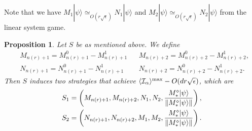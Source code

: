 \documentclass[11pt,letterpaper]{article}
\newcommand{\ket}[1]{|#1\rangle}
\DeclarePairedDelimiter{\norm}{\lVert}{\rVert}
\DeclarePairedDelimiter{\ip}{\langle}{\rangle}
\DeclareMathOperator{\spn}{span}
\DeclareMathOperator{\supp}{supp}
\newcommand{\1}{\mathbb{1}}
\newcommand{\nr}{n(r)}
\newcommand{\I}{\mathcal{I}}
\newcommand{\se}{\sqrt{\epsilon}}
\newcommand{\appd}[1]{\simeq_{#1}}
\newtheorem{proposition}[theorem]{Proposition}
\theoremstyle{definition}
\begin{document}
Note that we have $M_1 \ket{\psi} \appd{O(r\se)} N_1 \ket{\psi}$ and $M_2 \ket{\psi} \appd{O(r\se)} N_2 \ket{\psi}$ from the linear
system game.


\begin{proposition}
	Let $S$ be as mentioned above. We define
	\begin{align}
		&M_{\nr+1} = M_{\nr+1}^0 - M_{\nr+1}^1 && M_{\nr+2} = M_{\nr+2}^0 - M_{\nr+2}^1,\\
		&N_{\nr+1} = N_{\nr+1}^0 - N_{\nr+1}^1 && N_{\nr+2} = N_{\nr+2}^0 - N_{\nr+2}^1.
	\end{align}
	Then $S$ induces two strategies that achieve $\ip{\I_\alpha}^{\max} - O(d r\se)$, which are
	\begin{align}
		S_1 = \left(M_{\nr+1}, M_{\nr+2}, N_1, N_2, \frac{M_\ast^\diamond\ket{\psi}}{\norm{M_\ast^\diamond\ket{\psi}}}\right),\\
		S_2 = \left(N_{\nr+1}, N_{\nr+2}, M_1, M_2, \frac{M_\ast^\diamond\ket{\psi}}{\norm{M_\ast^\diamond\ket{\psi}}}\right).
	\end{align}
\end{proposition}
\end{document}
